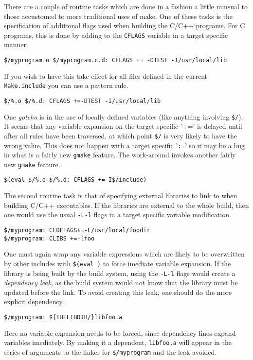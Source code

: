 \documentclass[letterpaper]{article}
\begin{document}
There are a couple of routine tasks which are done in a fashion a
little unusual to those accustomed to more traditional uses of make.
One of these tasks is the specification of additional
flags used when building the C/C++ programs.  For C programs, this is
done by adding to the \verb+CFLAGS+ variable in a target specific
manner.
\begin{verbatim}
$/myprogram.o $/myprogram.c.d: CFLAGS += -DTEST -I/usr/local/lib
\end{verbatim}
If you wish to have this take effect for all files defined in the
current \verb+Make.include+ you can use a pattern rule.
\begin{verbatim}
$/%.o $/%.d: CFLAGS +=-DTEST -I/usr/local/lib
\end{verbatim}
One {\em gotcha} is in the use of locally defined variables
(like anything involving \verb+$/+).  It seems
that any variable expansion on the target specific '+=' is
delayed until after all rules have been traversed, at which point
\verb+$/+ is very likely to have the wrong value.  This does not
happen with a target specific '\verb+:=+' so it may be a bug in what is
a fairly new \verb+gmake+ feature.  The work-around invokes another
fairly new \verb+gmake+ feature.
\begin{verbatim}
$(eval $/%.o $/%.d: CFLAGS +=-I$/include)
\end{verbatim}

The second routine task is that of specifying external libraries to
link to when building C/C++ executables.  If the libraries are
external to the whole build, then one would use the usual \verb+-L-l+
flags in a target specific variable modification.
\begin{verbatim}
$/myprogram: CLDFLAGS+=-L/usr/local/foodir
$/myprogram: CLIBS +=-lfoo
\end{verbatim}
One must again wrap any variable expressions which are likely to
be overwritten by other includes
with \verb+$(eval )+ to force imediate variable expansion.  If the
library is being built by the build system, using the \verb+-L-l+ flags would
create a {\em dependency leak}, as the build system would not know
that the library must be updated before the link.
To avoid creating this leak, one should do the more explicit dependency.
\begin{verbatim}
$/myprogram: ${THELIBDIR/}libfoo.a
\end{verbatim}
Here no variable expansion needs to be forced, since dependency lines
expand variables imediately.  By making it a dependent, \verb+libfoo.a+
will appear in the series of arguments to the linker for \verb+$/myprogram+
and the leak avoided.
\end{document}
